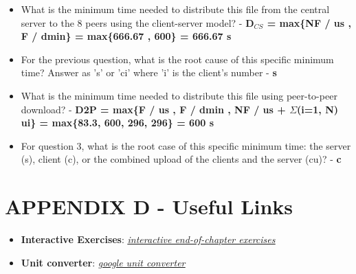 \documentclass{article}
\begin{document}
\begin{itemize}
	\item What is the minimum time needed to distribute this file from the central server to the 8 peers using the client-server model? - \textbf{D$_{CS}$ = max\{NF / us , F / dmin\} = max\{666.67 , 600\} = 666.67 s}
    \item For the previous question, what is the root cause of this specific minimum time? Answer as 's' or 'ci' where 'i' is the client's number - \textbf{s}
    \item What is the minimum time needed to distribute this file using peer-to-peer download? - \textbf{D2P = max\{F / us , F / dmin , NF / us + $\Sigma$(i=1, N) ui\} = max\{83.3, 600, 296, 296\} = 600 s}
    \item For question 3, what is the root case of this specific minimum time: the server (s), client (c), or the combined upload of the clients and the server (cu)? - \textbf{c}
\end{itemize}

\newpage

\section{APPENDIX D - Useful Links}
\begin{itemize}
	\item \textbf{Interactive Exercises}: \underline{\textit{\hyperlink{https://gaia.cs.umass.edu/kurose_ross/interactive/}{interactive end-of-chapter exercises}}}
	\item \textbf{Unit converter}: \underline{\textit{\hyperlink{https://www.google.com/search?q=unit+converter}{google unit converter}}}
\end{itemize}
\end{document}
